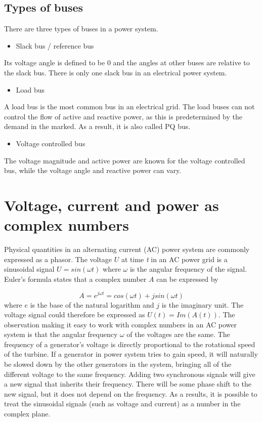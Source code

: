 \documentclass[class=book, crop=false]{standalone}
\begin{document}
\subsection{Types of buses}
There are three types of buses in a power system\cite{opf_intro}.


\begin{itemize}
  \item Slack bus / reference bus
\end{itemize}
Its voltage angle is defined to be 0 and the angles at other buses are relative to the slack bus. There is only one slack bus in an electrical power system.

\begin{itemize}
  \item Load bus
\end{itemize}
A load bus is the most common bus in an electrical grid. The load buses can not control the flow of active and reactive power, as this is predetermined by the demand in the marked. As a result, it is also called PQ bus.

\begin{itemize}
  \item Voltage controlled bus
\end{itemize}
The voltage magnitude and active power are known for the voltage controlled bus, while the voltage angle and reactive power can vary.

\section{Voltage, current and power as complex numbers}
Physical quantities in an alternating current (AC) power system are commonly expressed as a phasor. The voltage $U$ at time \textit{t} in an AC power grid is a sinusoidal signal $U = sin(\omega t)$ where $\omega$ is the angular frequency of the signal. Euler's formula states that a complex number $A$ can be expressed by

\begin{equation}\label{eq:eulers_equation}
    A = e^{j\omega t} = cos(\omega t) + jsin(\omega t)
\end{equation}
where $e$ is the base of the natural logarithm and $j$ is the imaginary unit. The voltage signal could therefore be expressed as $U(t) = Im(A(t))$. The observation making it easy to work with complex numbers in an AC power system is that the angular frequency $\omega$ of the voltages are the same. The frequency of a generator's voltage is directly proportional to the rotational speed of the turbine. If a generator in power system tries to gain speed, it will naturally be slowed down by the other generators in the system, bringing all of the different voltage to the same frequency. Adding two synchronous signals will give a new signal that inherits their frequency. There will be some phase shift to the new signal, but it does not depend on the frequency. As a results, it is possible to treat the sinusoidal signals (such as voltage and current) as a number in the complex plane.  
\end{document}
